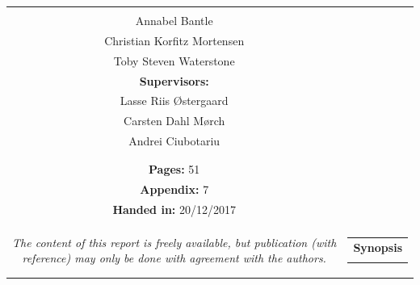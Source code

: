 \begin{titlepage}
\begin{nopagebreak}
{\begin{tabular}{cc}
{{\textbf{Participants:}\\
Annabel Bantle \\
Christian Korfitz Mortensen\\
Toby Steven Waterstone\\



\textbf{Supervisors:}\\
Lasse Riis Østergaard\\
Carsten Dahl Mørch\\
Andrei Ciubotariu
}\\
\\
\\
\textbf{Pages:} 51\\
\textbf{Appendix:} 7 \\
\textbf{Handed in:} 20/12/2017\\
\\
\textit{The content of this report is freely available, but publication (with reference) may only be done with
	agreement with the authors.}
\vfill } &
\parbox{7cm}{
  \vspace{.15cm}
  \hfill
  \begin{tabular}{l}
  {\textbf{Synopsis}}\bigskip \\
  \fbox{
    \parbox{6.5cm}{\bigskip
     {\vfill{\small 
     \bigskip}}
     }}
   \end{tabular}}
\end{tabular}} %



\end{nopagebreak}
\end{titlepage}
%